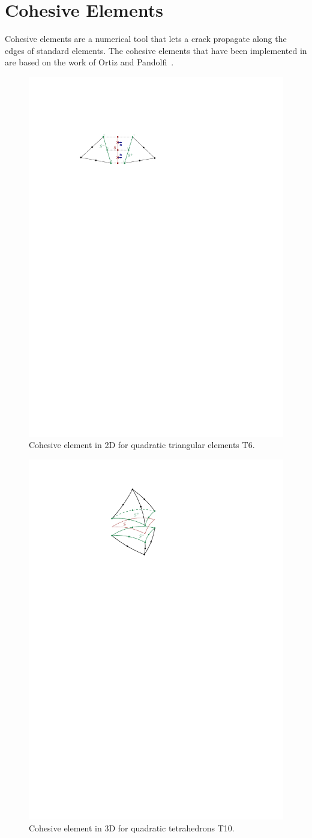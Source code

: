 
\section{Cohesive Elements}

Cohesive elements are a numerical tool that lets a crack propagate
along the edges of standard elements. The cohesive elements that have
been implemented in \akantu are based on the work of Ortiz and
Pandolfi~\cite{ortiz1999}.

\begin{figure}
  \centering
  \includegraphics[width=.6\textwidth]{figures/cohesive2d}
  \caption{Cohesive element in 2D for quadratic triangular elements
    T6.}
  \label{fig:smm:coh:cohesive2d}
\end{figure}

\begin{figure}
  \centering
  \includegraphics[width=.25\textwidth]{figures/cohesive3d}
  \caption{Cohesive element in 3D for quadratic tetrahedrons T10.}
  \label{fig:smm:coh:cohesive3d}
\end{figure}

